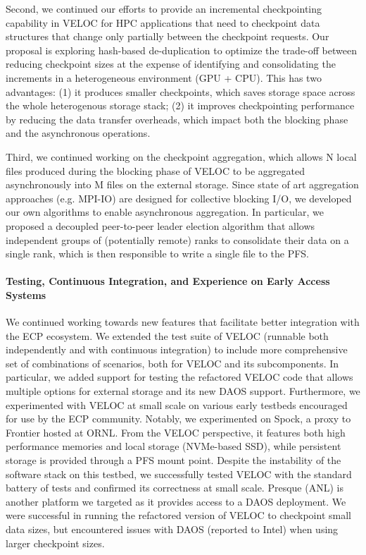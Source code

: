 Second, we continued our efforts to provide an incremental
checkpointing capability in VELOC for HPC applications that need to
checkpoint data structures that change only partially between the
checkpoint requests.  Our proposal is exploring hash-based
de-duplication to optimize the trade-off between reducing checkpoint
sizes at the expense of identifying and consolidating the increments
in a heterogeneous environment (GPU + CPU).  This has two advantages:
(1) it produces smaller checkpoints, which saves storage space across
the whole heterogenous storage stack; (2) it improves checkpointing
performance by reducing the data transfer overheads, which impact both
the blocking phase and the asynchronous operations.

Third, we continued working on the checkpoint aggregation, which allows
N local files produced during the blocking phase of VELOC to be aggregated
asynchronously into M files on the external storage. Since state of
art aggregation approaches (e.g. MPI-IO) are designed for collective
blocking I/O, we developed our own algorithms to enable asynchronous
aggregation. In particular, we proposed a decoupled peer-to-peer
leader election algorithm that allows independent groups of (potentially
remote) ranks to consolidate their data on a single rank, which is then
responsible to write a single file to the PFS.

\paragraph{Testing, Continuous Integration, and Experience on Early Access Systems}
We continued working towards new features that facilitate better
integration with the ECP ecosystem. We extended the test suite of
VELOC (runnable both independently and with continuous integration) to
include more comprehensive set of combinations of scenarios, both for
VELOC and its subcomponents. In particular, we added support for
testing the refactored VELOC code that allows multiple options for
external storage and its new DAOS support. Furthermore, we
experimented with VELOC at small scale on various early testbeds
encouraged for use by the ECP community. Notably, we experimented on
Spock, a proxy to Frontier hosted at ORNL. From the VELOC perspective,
it features both high performance memories and local storage
(NVMe-based SSD), while persistent storage is provided through a PFS
mount point. Despite the instability of the software stack on this
testbed, we successfully tested VELOC with the standard battery of
tests and confirmed its correctness at small scale. Presque (ANL) is
another platform we targeted as it provides access to a DAOS
deployment. We were successful in running the refactored version of
VELOC to checkpoint small data sizes, but encountered issues with DAOS
(reported to Intel) when using larger checkpoint sizes.

